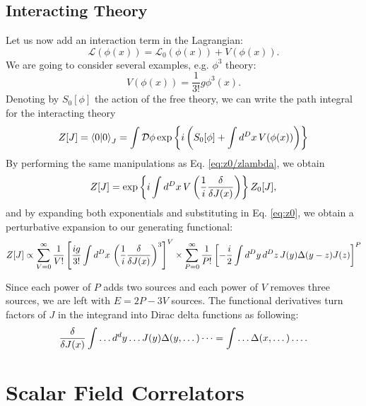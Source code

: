 \documentclass{article}
\numberwithin{equation}{section}
\begin{document}
\subsection{Interacting Theory}
Let us now add an interaction term in the Lagrangian:
\begin{equation}
    \mathcal{L}(\phi(x)) = \mathcal{L}_0(\phi(x)) + V(\phi(x)).
\end{equation}
We are going to consider several examples, e.g. $\phi^3$ theory:
\begin{equation}
    V(\phi(x)) = \frac{1}{3!}g \phi^3(x).
\end{equation}
Denoting by $S_0[\phi]$ the action of the free theory, we can write the path integral for the interacting theory
\begin{equation}
    Z[J] = \braket{0}{0}_J = \int \mathcal{D}\phi \exp\left\{i\left(S_0[\phi] + \int d^Dx \, V(\phi(x))\right)\right\}
\end{equation}
By performing the same manipulations as Eq. \ref{eq:z0/zlambda}, we obtain
\begin{equation}
    Z[J] = \exp\left\{i \int d^Dx \, V\left(\frac{1}{i}\fdv{J(x)}\right)\right\} Z_0[J],
\end{equation}
and by expanding both exponentials and substituting in Eq. \ref{eq:z0}, we obtain a perturbative expansion to our generating functional:
\begin{equation}
    Z[J] \propto \sum_{V=0}^\infty \frac{1}{V!} \left[\frac{ig}{3!} \int d^Dx \, \left(\frac{1}{i}\fdv{J(x)}\right)^3\right]^V \times \sum_{P=0}^\infty \frac{1}{P!} \left[-\frac{i}{2} \int d^Dy \, d^Dz \, J(y) \Delta(y-z)J(z)\right]^P
\end{equation}

Since each power of $P$ adds two sources and each power of $V$ removes three sources, we are left with $E=2P-3V$ sources. The functional derivatives turn factors of $J$ in the integrand into Dirac delta functions as following:
\begin{equation}
    \fdv{J(x)}\int \dots d^dy \dots J(y)\Delta(y, \dots) \dots = \int \dots \Delta(x, \dots) \dots .
\end{equation}

\section{Scalar Field Correlators}
\end{document}
